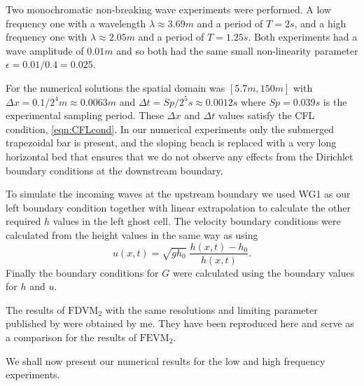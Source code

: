Two monochromatic non-breaking wave experiments were performed. A low frequency one with a wavelength $\lambda \approx 3.69m$ and a period of $T = 2s$, and a high frequency one with $\lambda \approx 2.05m$ and a period of $T = 1.25s$. Both experiments had a wave amplitude of $0.01m$ and so both had the same small non-linearity parameter $\epsilon = 0.01 / 0.4 = 0.025$. 

For the numerical solutions the spatial domain was $\left[5.7m,150m\right]$ with $\Delta x = 0.1 / 2^4 m \approx 0.0063m$ and $\Delta t = Sp / 2^5 s \approx 0.0012s$ where $Sp = 0.039 s$ is the experimental sampling period. These $\Delta x$ and $\Delta t$ values satisfy the CFL condition, \eqref{eqn:CFLcond}. In our numerical experiments only the submerged trapezoidal bar is present, and the sloping beach is replaced with a very long horizontal bed that ensures that we do not observe any effects from the Dirichlet boundary conditions at the downstream boundary.  

To simulate the incoming waves at the upstream boundary we used WG1 as our left boundary condition together with linear extrapolation to calculate the other required $h$ values in the left ghost cell. The velocity boundary conditions were calculated from the height values in the same way as \citet{Beji-Battjes-1994-1} using
\begin{equation*}
u(x,t) = \sqrt{g h_0} \; \dfrac{h(x,t) - h_0}{h(x,t)}.
\end{equation*}
Finally the boundary conditions for $G$ were calculated using the boundary values for $h$ and $u$. 

The results of $\text{FDVM}_2$ with the same resolutions and limiting parameter published by \citet{Zoppou-etal-2017} were obtained by me. They have been reproduced here and serve as a comparison for the results of $\text{FEVM}_2$. 

We shall now present our numerical results for the low and high frequency experiments.
%
